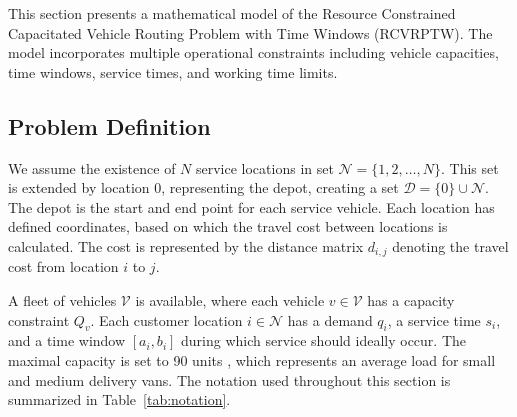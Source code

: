 This section presents a mathematical model of the Resource Constrained Capacitated Vehicle Routing Problem with Time Windows (RCVRPTW). The model incorporates multiple operational constraints including vehicle capacities, time windows, service times, and working time limits.

\subsection{Problem Definition}

We assume the existence of $N$ service locations in set $\mathcal{N} = \{1, 2, \dots, N\}$. This set is extended by location 0, representing the depot, creating a set $\mathcal{D} = \{0\} \cup \mathcal{N}$. The depot is the start and end point for each service vehicle. Each location has defined coordinates, based on which the travel cost between locations is calculated. The cost is represented by the distance matrix $d_{i,j}$ denoting the travel cost from location $i$ to $j$.

A fleet of vehicles $\mathcal{V}$ is available, where each vehicle $v \in \mathcal{V}$ has a capacity constraint $Q_v$. Each customer location $i \in \mathcal{N}$ has a demand $q_i$, a service time $s_i$, and a time window $[a_i, b_i]$ during which service should ideally occur. The maximal capacity is set to 90 units , which represents an average load for small and medium delivery vans. 
The notation used throughout this section is summarized in Table~\ref{tab:notation}.

